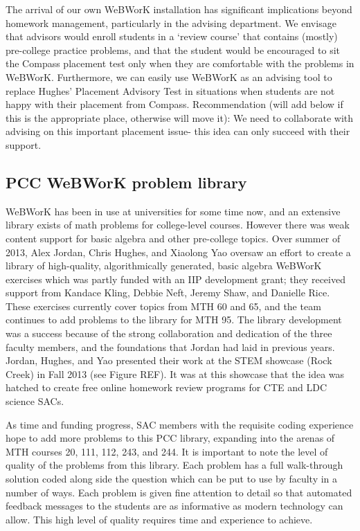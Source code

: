 The arrival of our own WeBWorK installation has significant implications beyond homework management, particularly in the advising department. We envisage that advisors would enroll students in a `review course' that contains (mostly) pre-college practice problems, and that the student would be encouraged to sit the Compass placement test only when they are comfortable with the problems in WeBWorK. Furthermore, we can easily use WeBWorK as an advising tool to replace Hughes' Placement Advisory Test in situations when students are not happy with their placement from Compass.  Recommendation (will add below if this is the appropriate place, otherwise will move it): We need to collaborate with advising on this important placement issue- this idea can only succeed with their support.

\subsection{PCC WeBWorK problem library}
WeBWorK has been in use at universities for some time now, and an extensive library exists of math problems for college-level courses. However there was weak content support for basic algebra and other pre-college topics. Over summer of 2013, Alex Jordan, Chris Hughes, and Xiaolong Yao oversaw an effort to create a library of high-quality, algorithmically generated, basic algebra WeBWorK exercises which was partly funded with an IIP development grant; they received support from Kandace Kling, Debbie Neft, Jeremy Shaw, and Danielle Rice.  These exercises currently cover topics from MTH 60 and 65, and the team continues to add problems to the library for MTH 95. The library development was a success because of the strong collaboration and dedication of the three faculty members, and the foundations that Jordan had laid in previous years. Jordan, Hughes, and Yao presented their work at the STEM showcase (Rock Creek) in Fall 2013 (see Figure REF). It was at this showcase that the idea was hatched to create free online homework review programs for CTE and LDC science SACs.

As time and funding progress, SAC members with the requisite coding experience hope to add more problems to this PCC library, expanding into the arenas of MTH courses 20, 111, 112, 243, and 244. It is important to note the level of quality of the problems from this library. Each problem has a full walk-through solution coded along side the question which can be put to use by faculty in a number of ways. Each problem is given fine attention to detail so that automated feedback messages to the students are as informative as modern technology can allow. This high level of quality requires time and experience to achieve.

